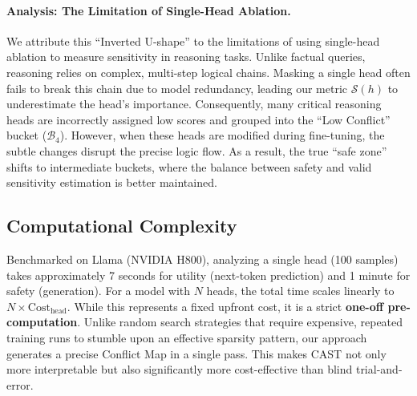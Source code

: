 \documentclass[11pt]{article}
\begin{document}
\paragraph{Analysis: The Limitation of Single-Head Ablation.}
We attribute this ``Inverted U-shape'' to the limitations of using single-head ablation to measure sensitivity in reasoning tasks. Unlike factual queries, reasoning relies on complex, multi-step logical chains. Masking a single head often fails to break this chain due to model redundancy, leading our metric $\mathcal{S}(h)$ to underestimate the head's importance. Consequently, many critical reasoning heads are incorrectly assigned low scores and grouped into the ``Low Conflict'' bucket ($\mathcal{B}_4$). However, when these heads are modified during fine-tuning, the subtle changes disrupt the precise logic flow. As a result, the true ``safe zone'' shifts to intermediate buckets, where the balance between safety and valid sensitivity estimation is better maintained.

\subsection{Computational Complexity}
Benchmarked on Llama (NVIDIA H800), analyzing a single head (100 samples) takes approximately 7 seconds for utility (next-token prediction) and 1 minute for safety (generation). For a model with $N$ heads, the total time scales linearly to $N \times \text{Cost}_{\text{head}}$. While this represents a fixed upfront cost, it is a strict \textbf{one-off pre-computation}. Unlike random search strategies that require expensive, repeated training runs to stumble upon an effective sparsity pattern, our approach generates a precise Conflict Map in a single pass. This makes CAST not only more interpretable but also significantly more cost-effective than blind trial-and-error.
\end{document}
